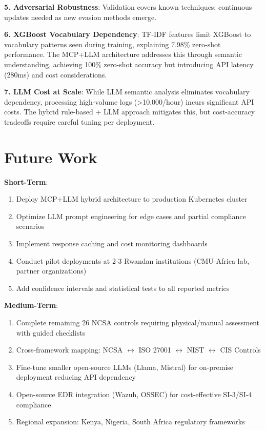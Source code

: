 \documentclass[11pt,conference]{IEEEtran}
\begin{document}
\textbf{5. Adversarial Robustness}: Validation covers known techniques; continuous updates needed as new evasion methods emerge.

\textbf{6. XGBoost Vocabulary Dependency}: TF-IDF features limit XGBoost to vocabulary patterns seen during training, explaining 7.98\% zero-shot performance. The MCP+LLM architecture addresses this through semantic understanding, achieving 100\% zero-shot accuracy but introducing API latency (280ms) and cost considerations.

\textbf{7. LLM Cost at Scale}: While LLM semantic analysis eliminates vocabulary dependency, processing high-volume logs (>10,000/hour) incurs significant API costs. The hybrid rule-based + LLM approach mitigates this, but cost-accuracy tradeoffs require careful tuning per deployment.

\section{Future Work}

\textbf{Short-Term}:
\begin{enumerate}
    \item Deploy MCP+LLM hybrid architecture to production Kubernetes cluster
    \item Optimize LLM prompt engineering for edge cases and partial compliance scenarios
    \item Implement response caching and cost monitoring dashboards
    \item Conduct pilot deployments at 2-3 Rwandan institutions (CMU-Africa lab, partner organizations)
    \item Add confidence intervals and statistical tests to all reported metrics
\end{enumerate}

\textbf{Medium-Term}:
\begin{enumerate}
    \item Complete remaining 26 NCSA controls requiring physical/manual assessment with guided checklists
    \item Cross-framework mapping: NCSA $\leftrightarrow$ ISO 27001 $\leftrightarrow$ NIST $\leftrightarrow$ CIS Controls
    \item Fine-tune smaller open-source LLMs (Llama, Mistral) for on-premise deployment reducing API dependency
    \item Open-source EDR integration (Wazuh, OSSEC) for cost-effective SI-3/SI-4 compliance
    \item Regional expansion: Kenya, Nigeria, South Africa regulatory frameworks
\end{enumerate}
\end{document}
